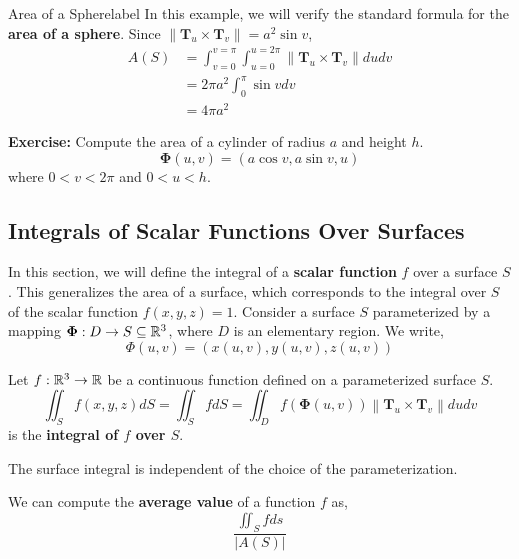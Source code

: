 \begin{ex}{Area of a Sphere}{label}
	In this example, we will verify the standard formula for the \textbf{area of a sphere}. Since $\|\mathbf{T}_u \times \mathbf{T}_v\| = a^2 \sin v$,
	\begin{align*}
		A(S) &= \int_{v=0}^{v=\pi} \int_{u=0}^{u=2 \pi}\left\|\mathbf{T}_u \times \mathbf{T}_v\right\| du d v \\
		&= 2 \pi a^2 \int_0^\pi \sin v d v \\
		&= 4 \pi a^2
	\end{align*}
\end{ex}

\begin{marginfigure}
	\textbf{Exercise:} Compute the area of a cylinder of radius $a$ and height $h$.
	\[\mathbf{\Phi}(u,v) = (a \cos v, a \sin v, u)\]
	where $0 < v < 2 \pi$ and $0 < u < h$.
\end{marginfigure}

\subsection{Integrals of Scalar Functions Over Surfaces}
In this section, we will define the integral of a \textbf{scalar function} $f$ over a surface $S$. This generalizes the area of a surface, which corresponds to the integral over $S$ of the scalar function $f(x, y, z) = 1$. Consider a surface $S$ parameterized by a mapping $\mathbf{\Phi} : D \rightarrow S \subseteq \mathbb{R}^3$, where $D$ is an elementary region. We write,
\[\Phi(u, v)=(x(u, v), y(u, v), z(u, v))\]

\begin{defn}
	Let $f: \mathbb{R}^3 \rightarrow \mathbb{R}$ be a continuous function defined on a parameterized surface $S$.
	\[\iint_S f(x, y, z) d S =\iint_S f d S=\iint_D f(\boldsymbol{\Phi}(u, v))\left\|\mathbf{T}_u \times \mathbf{T}_v\right\| d u d v\]
	is the \textbf{integral of $f$ over $S$}.
\end{defn}

\begin{marginfigure}
	The surface integral is independent of the choice of the parameterization.
\end{marginfigure}

\begin{rmk}
	We can compute the \textbf{average value} of a function $f$ as,
	\[\frac{\iint_S f ds}{|A(S)|}\]
\end{rmk}

